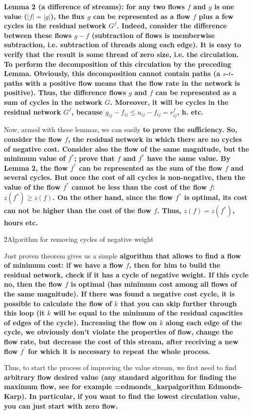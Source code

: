 \bf{Lemma 2} (a difference of streams): for any two flows $f$ and $g$ is one value ($|f| = |g|$), the flux $g$ can be represented as a flow $f$ plus a few cycles in the residual network $G^f$. Indeed, consider the difference between these flows $g-f$ (subtraction of flows is memberwise subtraction, i.e. subtraction of threads along each edge). It is easy to verify that the result is some thread of zero size, i.e. the circulation. To perform the decomposition of this circulation by the preceding Lemma. Obviously, this decomposition cannot contain paths (a $s$-$t$-paths with a positive flow means that the flow rate in the network is positive). Thus, the difference flows $g$ and $f$ can be represented as a sum of cycles in the network $G$. Moreover, it will be cycles in the residual network $G^f$, because $g_{ij} - f_{ij} \le u_{ij} - f_{ij} = r_{ij}^f$, h. etc.

Now, armed with these lemmas, we can easily \bf{to prove the sufficiency}. So, consider the flow $f$, the residual network in which there are no cycles of negative cost. Consider also the flow of the same magnitude, but the minimum value of $f^*$; prove that $f$ and $f^*$ have the same value. By Lemma 2, the flow $f^*$ can be represented as the sum of the flow $f$ and several cycles. But once the cost of all cycles is non-negative, then the value of the flow $f^*$ cannot be less than the cost of the flow $f$: $z(f^*) \ge z(f)$. On the other hand, since the flow $f^*$ is optimal, its cost can not be higher than the cost of the flow $f$. Thus, $z(f) = z(f^*)$, hours etc.

\h2{Algorithm for removing cycles of negative weight}

Just proven theorem gives us a simple \bf{algorithm} that allows to find a flow of minimum cost: if we have a flow $f$, then for him to build the residual network, check if it has a cycle of negative weight. If this cycle no, then the flow $f$ is optimal (has minimum cost among all flows of the same magnitude). If there was found a negative cost cycle, it is possible to calculate the flow of $k$ that you can skip further through this loop (it $k$ will be equal to the minimum of the residual capacities of edges of the cycle). Increasing the flow on $k$ along each edge of the cycle, we obviously don't violate the properties of flow, change the flow rate, but decrease the cost of this stream, after receiving a new flow $f^\prime$ for which it is necessary to repeat the whole process.

Thus, to start the process of improving the value stream, we first need to find \bf{arbitrary flow desired value} (any standard algorithm for finding the maximum flow, see for example \algohref=edmonds_karp{algorithm Edmonds-Karp}). In particular, if you want to find the lowest circulation value, you can just start with zero flow.

